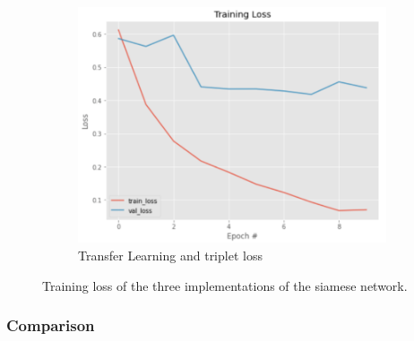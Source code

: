 \begin{figure}[h]
\begin{subfigure}[b]{0.48\linewidth}
   \includegraphics[width=\linewidth]{figs/tri_loss_2.png}
   \caption{Transfer Learning and triplet loss}
   \label{fig:tri_loss_2}
  \end{subfigure}
  \hfill
    \caption{Training loss of the three implementations of the siamese network.}
    \label{fig:siatrainloss}
\end{figure}

\subsubsection{Comparison}

